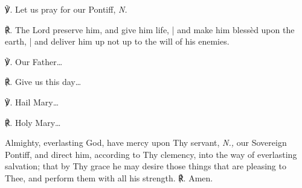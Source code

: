 \begin{otherlanguage}{english}


\noindent ℣. Let us pray for our Pontiff, \textit{N.}

\noindent ℟. The Lord preserve him, and give him life, | and make him blessèd upon the earth, | and deliver him up not up to the will of his enemies.

\noindent ℣. Our Father…

\noindent ℟. Give us this day…

\noindent ℣. Hail Mary…

\noindent ℟. Holy Mary…


Almighty, everlasting God, have mercy upon Thy servant, \textit{N.,}  our Sovereign Pontiff, and direct him, according to Thy clemency, into the way of everlasting salvation; that by Thy grace he may desire those things that are pleasing to Thee, and perform them with all his strength. ℟. Amen.



\end{otherlanguage}